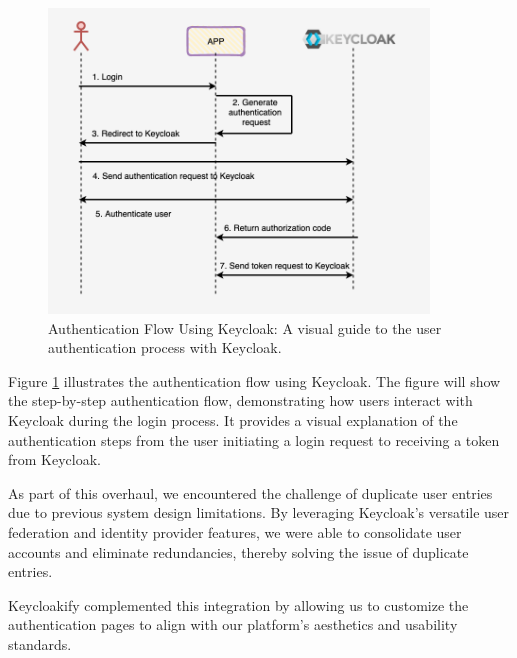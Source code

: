 \begin{figure}[H]
    \centering
    \includegraphics[width=0.9\textwidth]{src/assets/chapters/keycloak-diagram.png}
    \caption{Authentication Flow Using Keycloak: A visual guide to the user authentication process with Keycloak.}
    \label{fig:authentication_flow_keycloak}
\end{figure}

Figure \ref{fig:authentication_flow_keycloak} illustrates the authentication flow using Keycloak. The figure will show the step-by-step authentication flow, demonstrating how users interact with Keycloak during the login process. It provides a visual explanation of the authentication steps from the user initiating a login request to receiving a token from Keycloak.

As part of this overhaul, we encountered the challenge of duplicate user entries due to previous system design limitations. By leveraging Keycloak’s versatile user federation and identity provider features, we were able to consolidate user accounts and eliminate redundancies, thereby solving the issue of duplicate entries. 

Keycloakify complemented this integration by allowing us to customize the authentication pages to align with our platform's aesthetics and usability standards.

